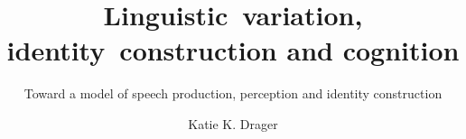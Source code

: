 \title{\mbox{Linguistic variation,} \mbox{identity construction} and cognition}
\subtitle{Toward a model of speech production, perception and identity construction}
\author{Katie K. Drager}
\renewcommand{\lsISBNdigital}{000-0-000000-00-0}
\renewcommand{\lsISBNhardcover}{000-0-000000-00-0}
\renewcommand{\lsISBNsoftcover}{000-0-000000-00-0}
\renewcommand{\lsSeries}{silp} %
\renewcommand{\lsSeriesNumber}{2} %
